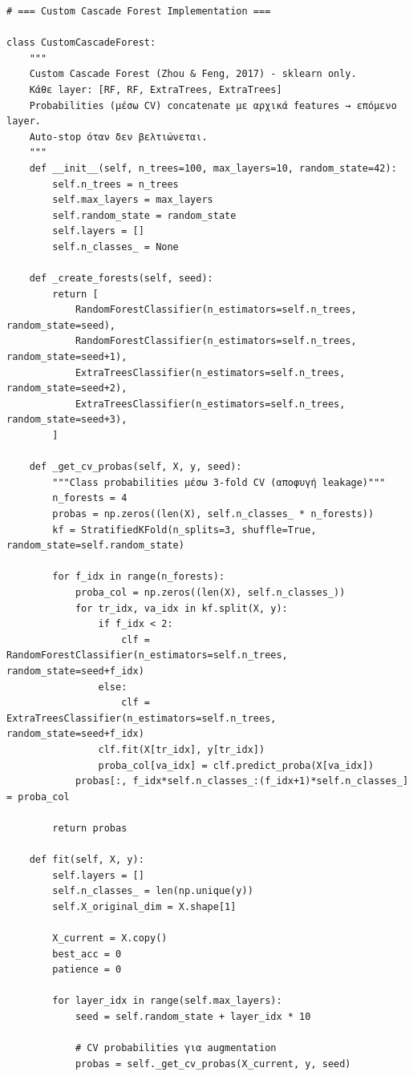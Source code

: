 \begin{lstlisting}
# === Custom Cascade Forest Implementation ===
 
class CustomCascadeForest:
    """
    Custom Cascade Forest (Zhou & Feng, 2017) - sklearn only.
    Κάθε layer: [RF, RF, ExtraTrees, ExtraTrees]
    Probabilities (μέσω CV) concatenate με αρχικά features → επόμενο layer.
    Auto-stop όταν δεν βελτιώνεται.
    """
    def __init__(self, n_trees=100, max_layers=10, random_state=42):
        self.n_trees = n_trees
        self.max_layers = max_layers
        self.random_state = random_state
        self.layers = []
        self.n_classes_ = None
 
    def _create_forests(self, seed):
        return [
            RandomForestClassifier(n_estimators=self.n_trees, random_state=seed),
            RandomForestClassifier(n_estimators=self.n_trees, random_state=seed+1),
            ExtraTreesClassifier(n_estimators=self.n_trees, random_state=seed+2),
            ExtraTreesClassifier(n_estimators=self.n_trees, random_state=seed+3),
        ]
 
    def _get_cv_probas(self, X, y, seed):
        """Class probabilities μέσω 3-fold CV (αποφυγή leakage)"""
        n_forests = 4
        probas = np.zeros((len(X), self.n_classes_ * n_forests))
        kf = StratifiedKFold(n_splits=3, shuffle=True, random_state=self.random_state)
 
        for f_idx in range(n_forests):
            proba_col = np.zeros((len(X), self.n_classes_))
            for tr_idx, va_idx in kf.split(X, y):
                if f_idx < 2:
                    clf = RandomForestClassifier(n_estimators=self.n_trees, random_state=seed+f_idx)
                else:
                    clf = ExtraTreesClassifier(n_estimators=self.n_trees, random_state=seed+f_idx)
                clf.fit(X[tr_idx], y[tr_idx])
                proba_col[va_idx] = clf.predict_proba(X[va_idx])
            probas[:, f_idx*self.n_classes_:(f_idx+1)*self.n_classes_] = proba_col
 
        return probas
 
    def fit(self, X, y):
        self.layers = []
        self.n_classes_ = len(np.unique(y))
        self.X_original_dim = X.shape[1]
 
        X_current = X.copy()
        best_acc = 0
        patience = 0
 
        for layer_idx in range(self.max_layers):
            seed = self.random_state + layer_idx * 10
 
            # CV probabilities για augmentation
            probas = self._get_cv_probas(X_current, y, seed)
 

\end{lstlisting}
